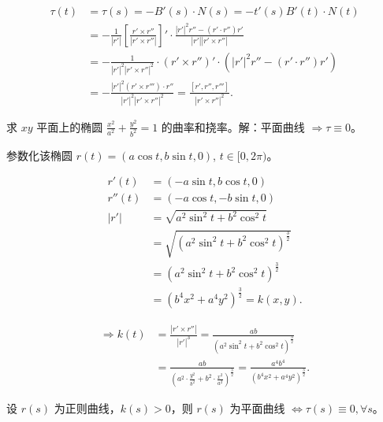 \documentclass[lang=cn,10pt,thmcnt=section]{elegantbook}
\begin{document}
\begin{align*}
    \tau(t) &= \tau(s) = -B'(s) \cdot N(s) = -t'(s) B'(t) \cdot N(t) \\
    &= -\frac{1}{|r'|} \left[ \frac{r' \times r''}{|r' \times r''|} \right]' \cdot \frac{|r'|^2 r'' - (r' \cdot r'') r'}{|r'| |r' \times r''|} \\
    &= -\frac{1}{|r'|^2 |r' \times r''|^2} \cdot (r' \times r'')' \cdot \left( |r'|^2 r'' - (r' \cdot r'') r' \right) \\
    &= -\frac{|r'|^2 (r' \times r''') \cdot r''}{|r'|^2 |r' \times r''|^2} = \frac{[r', r'', r''']}{|r' \times r''|^2}.
\end{align*} 
\begin{example}[求椭圆的曲率]
    求 $xy$ 平面上的椭圆 $\frac{x^2}{a^2} + \frac{y^2}{b^2} = 1$ 的曲率和挠率。解：平面曲线 $\Rightarrow \tau \equiv 0$。
    
    参数化该椭圆 $r(t) = (a \cos t, b \sin t, 0)$, $t \in [0, 2\pi)$。
    \end{example}
    
    \begin{align*}
    r'(t) &= (-a \sin t, b \cos t, 0) \\
    r''(t) &= (-a \cos t, -b \sin t, 0) \\
    |r'| &= \sqrt{a^2 \sin^2 t + b^2 \cos^2 t} \\
    &= \sqrt{(a^2 \sin^2 t + b^2 \cos^2 t)^{\frac{3}{2}}} \\
    &= (a^2 \sin^2 t + b^2 \cos^2 t)^{\frac{3}{2}} \\
    &= (b^4 x^2 + a^4 y^2)^{\frac{3}{2}} = k(x, y).
    \end{align*}
    
    \begin{align*}
    \Rightarrow k(t) &= \frac{|r' \times r''|}{|r'|^3} = \frac{ab}{(a^2 \sin^2 t + b^2 \cos^2 t)^{\frac{3}{2}}} \\
    &= \frac{ab}{(a^2 \cdot \frac{y^2}{b^2} + b^2 \cdot \frac{x^2}{a^2})^{\frac{3}{2}}} = \frac{a^4 b^4}{(b^4 x^2 + a^4 y^2)^{\frac{3}{2}}}.
\end{align*}
\begin{theorem}[平面曲线的挠率]
    设 $r(s)$ 为正则曲线，$k(s) > 0$，则 $r(s)$ 为平面曲线 $\Leftrightarrow \tau(s) \equiv 0, \forall s$。
    \end{theorem}
    
\end{document}
